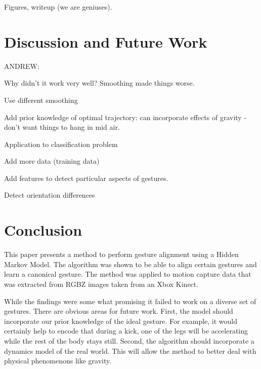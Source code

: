 \documentclass{article}
\begin{document}
Figures, writeup (we are geniuses).

\section{Discussion and Future Work}

ANDREW:

Why didn't it work very well? Smoothing made things worse.

Use different smoothing

Add prior knowledge of optimal trajectory: can incorporate effects of gravity
- don't want things to hang in mid air.

Application to classification problem

Add more data (training data)

Add features to detect particular aspects of gestures.

Detect orientation differences

\section{Conclusion}

This paper presents a method to perform gesture alignment using a Hidden
Markov Model. The algorithm was shown to be able to align certain gestures and
learn a canonical gesture. The method was applied to motion capture data that
was extracted from RGBZ images taken from an Xbox Kinect.

While the findings were some what promising it failed to work on a diverse set
of gestures. There are obvious areas for future work. First, the model should
incorporate our prior knowledge of the ideal gesture. For example, it would
certainly help to encode that during a kick, one of the legs will be
accelerating while the rest of the body stays still. Second, the algorithm
should incorporate a dynamics model of the real world. This will allow the
method to better deal with physical phenomenons like gravity.







\end{document}
